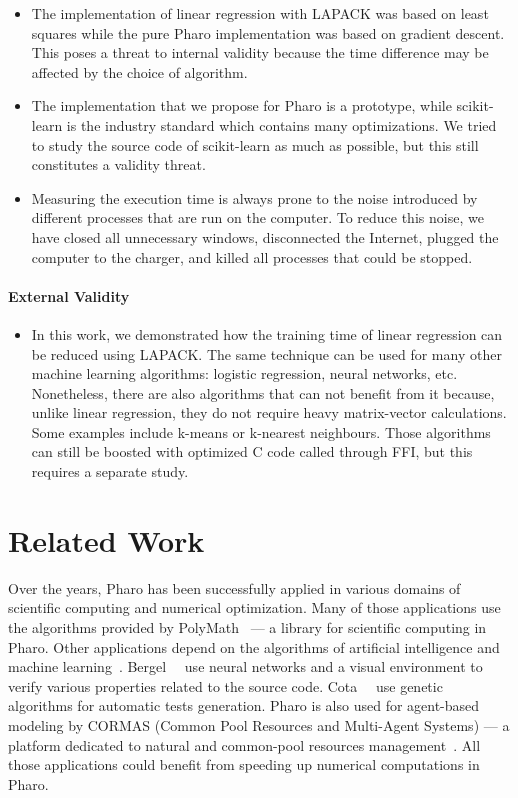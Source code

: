 \documentclass[]{ceurart}
\begin{document}
\begin{itemize}
  \item The implementation of linear regression with LAPACK was based on least squares while the pure Pharo implementation was based on gradient descent. This poses a threat to internal validity because the time difference may be affected by the choice of algorithm.
  \item The implementation that we propose for Pharo is a prototype, while scikit-learn is the industry standard which contains many optimizations. We tried to study the source code of scikit-learn as much as possible, but this still constitutes a validity threat.
  \item Measuring the execution time is always prone to the noise introduced by different processes that are run on the computer. To reduce this noise, we have closed all unnecessary windows, disconnected the Internet, plugged the computer to the charger, and killed all processes that could be stopped.
\end{itemize}

\paragraph{External Validity}

\begin{itemize}
  \item In this work, we demonstrated how the training time of linear regression can be reduced using LAPACK. The same technique can be used for many other machine learning algorithms: logistic regression, neural networks, etc. Nonetheless, there are also algorithms that can not benefit from it because, unlike linear regression, they do not require heavy matrix-vector calculations. Some examples include k-means or k-nearest neighbours. Those algorithms can still be boosted with optimized C code called through FFI, but this requires a separate study.
\end{itemize}



\section{Related Work}
\label{sec:RelatedWork}

Over the years, Pharo has been successfully applied in various domains of scientific computing and numerical optimization.
Many of those applications use the algorithms provided by PolyMath~\cite{Bess16a} --- a library for scientific computing in Pharo.
Other applications depend on the algorithms of artificial intelligence and machine learning~\cite{Berg20a}.
Bergel~\etal~\cite{Berg18b} use neural networks and a visual environment to verify various properties related to the source code.
Cota~\etal~\cite{Cota20a} use genetic algorithms for automatic tests generation.
Pharo is also used for agent-based modeling by CORMAS (Common Pool Resources and Multi-Agent Systems) --- a platform dedicated to natural
and common-pool resources management~\cite{Bomm16a,Lepa12a}.
All those applications could benefit from speeding up numerical computations in Pharo.
\end{document}
